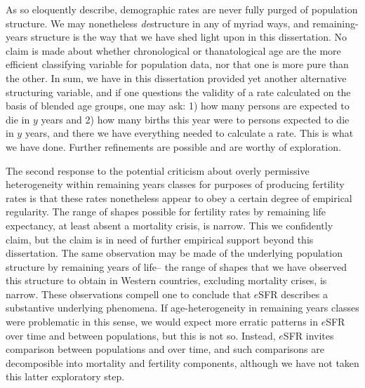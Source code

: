 As \citet{stolnitz1949recent} so eloquently describe, demographic rates are
never fully purged of population structure. We may nonetheless \textit{de}structure in
any of myriad ways, and remaining-years structure is the way that we have shed
light upon in this dissertation. No claim is made about whether chronological or
thanatological age are the more efficient classifying variable for population
data, nor that one is more pure than the other. In sum, we have in this
dissertation provided yet another alternative structuring variable, and if one
questions the validity of a rate calculated on the basis of blended age groups,
one may ask: 1) how many persons are expected to die in $y$ years and 2) how
many births this year were to persons expected to die in $y$ years, and there we
have everything needed to calculate a rate. This is what we have done. Further
refinements are possible and are worthy of exploration.

The second response to the potential criticism about overly permissive
heterogeneity within remaining years classes for purposes of producing
fertility rates is that these rates nonetheless appear to obey a
certain degree of empirical regularity. The range of shapes possible for
fertility rates by remaining life expectancy, at least absent a mortality
crisis, is narrow. This we confidently claim, but the claim is in need of
further empirical support beyond this dissertation. The same observation may be made of
the underlying population structure by remaining years of life-- the range of 
shapes that we have observed this structure to obtain in Western countries, 
excluding mortality crises, is
narrow. These observations compell one to conclude that $e$SFR describes
a substantive underlying phenomena. If age-heterogeneity in remaining years
classes were problematic in this sense, we would expect more erratic patterns in
$e$SFR over time and between populations, but this is not so. Instead, $e$SFR
invites comparison between populations and over time, and such comparisons are
decomposible into mortality and fertility components, although we have not
taken this latter exploratory step. 

